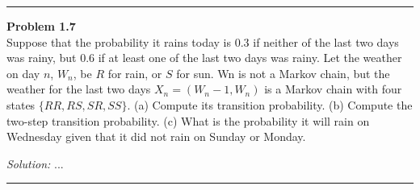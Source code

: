 \documentclass[a4paper, 11pt]{article}
\newenvironment{problem}[2][Problem]
    { \begin{mdframed}[backgroundcolor=gray!20] \textbf{#1 #2} \\}
    {  \end{mdframed}}
\newenvironment{solution}
    {\textit{Solution:}}
    {}
\begin{document}
\noindent\rule{7in}{2.8pt}
\begin{problem}{1.7}
Suppose that the probability it rains today is 0.3 if neither of the last two
days was rainy, but 0.6 if at least one of the last two days was rainy. Let the
weather on day $n$, $W_n$, be $R$ for rain, or $S$ for sun. Wn is not a Markov chain,
but the weather for the last two days $X_n = (W_n-1,W_n)$ is a Markov chain
with four states $\{RR,RS, SR, SS\}$. (a) Compute its transition probability. (b)
Compute the two-step transition probability. (c) What is the probability it will
rain on Wednesday given that it did not rain on Sunday or Monday.
\end{problem}
\begin{solution}
...
\end{solution}

\noindent\rule{7in}{2.8pt}
\end{document}
